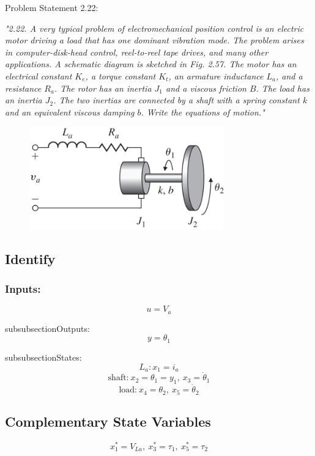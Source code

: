 \documentclass{article}
\begin{document}
Problem Statement 2.22:

\textit{
    "2.22. A very typical problem of electromechanical position control is an electric motor driving a load that has one dominant vibration mode. The problem arises in computer-disk-head control, reel-to-reel tape drives, and many other applications. A schematic diagram is sketched in Fig. 2.57. The motor has an electrical constant 
    $K_e$, a torque constant 
    $K_t$, an armature inductance 
    $L_a$, and a resistance 
    $R_a$. The rotor has an inertia 
    $J_1$ and a viscous friction $B$. The load has an inertia 
    $J_2$. The two inertias are connected by a shaft with a spring constant $k$ and an equivalent viscous damping $b$. Write the equations of motion."
}

\begin{figure}[H]
    \centering
    \includegraphics[width=0.75\textwidth]{fig27.png}
\end{figure}

\subsection{Identify}
\subsubsection{Inputs:}
    \[
    u = V_a
    \]

 subsubsection{Outputs:}
    \[
    y = \theta_1
    \]

 subsubsection{States:}
    \[
    L_a : x_1 = i_a
    \]
    \[
    \text{shaft:} \ x_2 = \theta_1 = y_1, \ x_3 = \dot{\theta}_1
    \]
    \[
    \text{load:} \ x_4 = \theta_2, \ x_5 = \dot{\theta}_2
    \]

\subsection{Complementary State Variables}
\[
x^*_1 = V_{La}, \ x^*_3 = \tau_1, \ x^*_5 = \tau_2
\]
\end{document}
